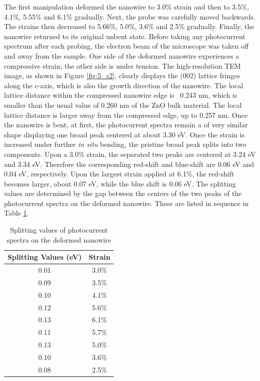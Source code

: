The first manipulation deformed the nanowire to 3.0\% strain and then to 3.5\%, 4.1\%, 5.55\% and 6.1\% gradually. 
Next, the probe was carefully moved backwards. 
The strains then decreased to 5.66\%, 5.0\%, 3.6\% and 2.5\% gradually. 
Finally, the nanowire returned to its original unbent state. 
Before taking any photocurrent spectrum after each probing, the electron beam of the microscope was taken off and away from the sample. 
One side of the deformed nanowire experiences a compressive strain; the other side is under tension. 
The high-resolution TEM image, as shown in Figure \ref{fig:5_s2}, clearly displays the (002) lattice fringes along the c-axis, which is also the growth direction of the nanowire.\cite{zhang2015opto} 
The local lattice distance within the compressed nanowire edge is ~0.243 nm, which is smaller than the usual value of 0.260 nm of the ZnO bulk material.\cite{L.2011} 
The local lattice distance is larger away from the compressed edge, up to 0.257 nm. 
Once the nanowire is bent, at first, the photocurrent spectra remain a of very similar shape displaying one broad peak centered at about 3.30 eV. 
Once the strain is increased under further \textit{in situ} bending, the pristine broad peak splits into two components. 
Upon a 3.0\% strain, the separated two peaks are centered at 3.24 eV and 3.34 eV. 
Therefore the corresponding red-shift and blue-shift are 0.06 eV and 0.04 eV, respectively. 
Upon the largest strain applied at 6.1\%, the red-shift becomes larger, about 0.07 eV, while the blue shift is 0.06 eV. 
The splitting values are determined by the gap between the centers of the two peaks of the photocurrent spectra on the deformed nanowire. These are listed in sequence in Table \ref{tab:5_1}. 
\begin{table}
    \centering
    \begin{tabular}{c|c}
    \hline
         Splitting Values (eV) & Strain\\
         \hline
         0.01 & 3.0\%\\ 
         0.09 & 3.5\%\\
         0.10 & 4.1\%\\
         0.12 & 5.6\%\\
         0.13 & 6.1\%\\
         0.11 & 5.7\%\\
         0.13 & 5.0\%\\
         0.10 & 3.6\%\\
         0.08 & 2.5\%\\
         \hline
    \end{tabular}
    \caption{Splitting values of photocurrent spectra on the deformed nanowire}
    \label{tab:5_1}
\end{table}
 
